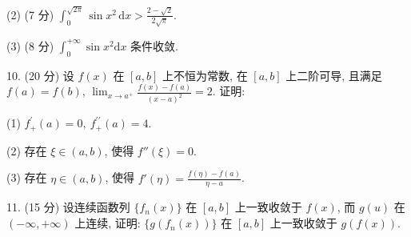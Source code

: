 \documentclass{examcollection}
\begin{document}
{\begin{minipage}{\textwidth}
(2) (7 分) $\int_{0}^{\sqrt{2\pi}} \sin x^{2} \, \mathrm{d}x > \frac{2 - \sqrt{2}}{2\sqrt{\pi}}$.\par
(3) (8 分) $\int_{0}^{+\infty}\sin x^{2}\mathrm{d}x$ 条件收敛.\par
10. (20 分) 设 $f(x)$ 在 $[a, b]$ 上不恒为常数, 在 $[a, b]$ 上二阶可导, 且满足 $f(a) = f(b)$, $\lim_{x \to a^{+}} \frac{f(x) - f(a)}{(x - a)^2} = 2$. 证明:\par
(1) $f_{+}^{\prime}(a)=0,\ f_{+}^{\prime\prime}(a)=4.$\par
(2) 存在 $\xi \in (a, b)$, 使得 $f''(\xi) = 0$.\par
(3) 存在 $\eta \in (a, b)$, 使得 $f'(\eta) = \frac{f(\eta) - f(a)}{\eta - a}$.\par
11. (15 分) 设连续函数列 $\{f_n(x)\}$ 在 $[a, b]$ 上一致收敛于 $f(x)$, 而 $g(u)$ 在 $(- \infty, +\infty)$ 上连续, 证明: $\{g(f_n(x))\}$ 在 $[a, b]$ 上一致收敛于 $g(f(x))$.\par
\end{minipage}}
\ifdim\dimexpr\ht\proofbox+\dp\proofbox\relax>\textheight
\noindent\resizebox{!}{\textheight}{\usebox{\proofbox}}\else\noindent\usebox{\proofbox}\fi\clearpage
\end{document}
